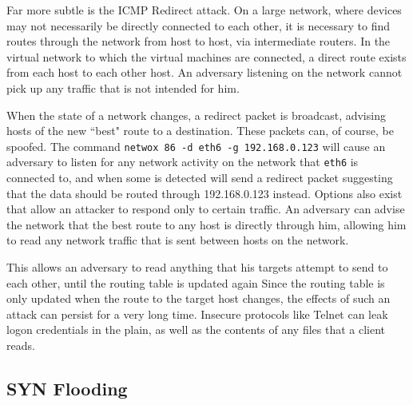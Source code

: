 Far more subtle is the ICMP Redirect attack. On a large network, where devices may not necessarily be directly connected
to each other, it is necessary to find routes through the network from host to host, via intermediate routers. In the
virtual network to which the virtual machines are connected, a direct route exists from each host to each other host. An
adversary listening on the network cannot pick up any traffic that is not intended for him.


When the state of a network changes, a redirect packet is broadcast, advising hosts of the new ``best" route to a
destination. These packets can, of course, be spoofed. The command {\tt netwox 86 -d eth6 -g 192.168.0.123} will cause
an adversary to listen for any network activity on the network that {\tt eth6} is connected to, and when some is
detected will send a redirect packet suggesting that the data should be routed through 192.168.0.123 instead. Options
also exist that allow an attacker to respond only to certain traffic. An adversary can advise the network that the best
route to any host is directly through him, allowing him to read any network traffic that is sent between hosts on the
network.


This allows an adversary to read anything that his targets attempt to send to each other, until the routing table is
updated again Since the routing table is only updated when the route to the target host changes, the effects of such an
attack can persist for a very long time. Insecure protocols like Telnet can leak logon credentials in the plain, as well
as the contents of any files that a client reads.

\subsection{SYN Flooding}

